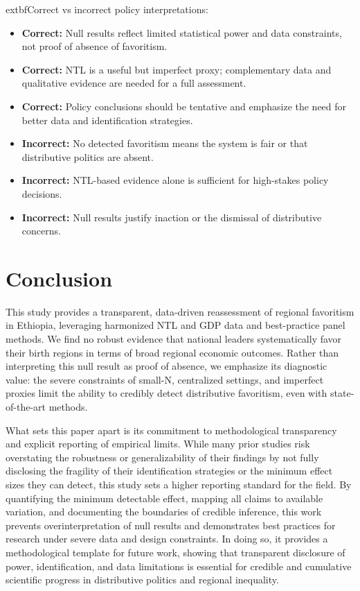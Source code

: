 \documentclass[12pt,a4paper]{article}
\begin{document}
	extbf{Correct vs incorrect policy interpretations:}
\begin{itemize}
	\item \textbf{Correct:} Null results reflect limited statistical power and data constraints, not proof of absence of favoritism.
	\item \textbf{Correct:} NTL is a useful but imperfect proxy; complementary data and qualitative evidence are needed for a full assessment.
	\item \textbf{Correct:} Policy conclusions should be tentative and emphasize the need for better data and identification strategies.
	\item \textbf{Incorrect:} No detected favoritism means the system is fair or that distributive politics are absent.
	\item \textbf{Incorrect:} NTL-based evidence alone is sufficient for high-stakes policy decisions.
	\item \textbf{Incorrect:} Null results justify inaction or the dismissal of distributive concerns.
\end{itemize}

\section{Conclusion}


This study provides a transparent, data-driven reassessment of regional favoritism in Ethiopia, leveraging harmonized NTL and GDP data and best-practice panel methods. We find no robust evidence that national leaders systematically favor their birth regions in terms of broad regional economic outcomes. Rather than interpreting this null result as proof of absence, we emphasize its diagnostic value: the severe constraints of small-N, centralized settings, and imperfect proxies limit the ability to credibly detect distributive favoritism, even with state-of-the-art methods.

What sets this paper apart is its commitment to methodological transparency and explicit reporting of empirical limits. While many prior studies risk overstating the robustness or generalizability of their findings by not fully disclosing the fragility of their identification strategies or the minimum effect sizes they can detect, this study sets a higher reporting standard for the field. By quantifying the minimum detectable effect, mapping all claims to available variation, and documenting the boundaries of credible inference, this work prevents overinterpretation of null results and demonstrates best practices for research under severe data and design constraints. In doing so, it provides a methodological template for future work, showing that transparent disclosure of power, identification, and data limitations is essential for credible and cumulative scientific progress in distributive politics and regional inequality.
\end{document}
